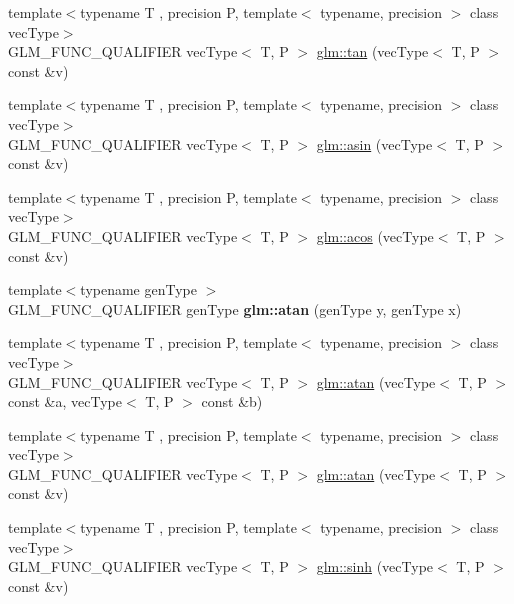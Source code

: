 \begin{DoxyCompactItemize}
\item 
{\footnotesize template$<$typename T , precision P, template$<$ typename, precision $>$ class vec\+Type$>$ }\\G\+L\+M\+\_\+\+F\+U\+N\+C\+\_\+\+Q\+U\+A\+L\+I\+F\+I\+ER vec\+Type$<$ T, P $>$ \hyperlink{group__core__func__trigonometric_gab3ae890c38b7d3aa4d5e00998fd296b2}{glm\+::tan} (vec\+Type$<$ T, P $>$ const \&v)
\item 
{\footnotesize template$<$typename T , precision P, template$<$ typename, precision $>$ class vec\+Type$>$ }\\G\+L\+M\+\_\+\+F\+U\+N\+C\+\_\+\+Q\+U\+A\+L\+I\+F\+I\+ER vec\+Type$<$ T, P $>$ \hyperlink{group__core__func__trigonometric_ga88e29b8289e882859d76a25798dd9490}{glm\+::asin} (vec\+Type$<$ T, P $>$ const \&v)
\item 
{\footnotesize template$<$typename T , precision P, template$<$ typename, precision $>$ class vec\+Type$>$ }\\G\+L\+M\+\_\+\+F\+U\+N\+C\+\_\+\+Q\+U\+A\+L\+I\+F\+I\+ER vec\+Type$<$ T, P $>$ \hyperlink{group__core__func__trigonometric_ga58ad259b788528fe0a4bd2eeb5e381cc}{glm\+::acos} (vec\+Type$<$ T, P $>$ const \&v)
\item 
\mbox{\label{func__trigonometric_8inl_a29204e55958a4011bfd1a6df7129984b}} 
{\footnotesize template$<$typename gen\+Type $>$ }\\G\+L\+M\+\_\+\+F\+U\+N\+C\+\_\+\+Q\+U\+A\+L\+I\+F\+I\+ER gen\+Type {\bfseries glm\+::atan} (gen\+Type y, gen\+Type x)
\item 
{\footnotesize template$<$typename T , precision P, template$<$ typename, precision $>$ class vec\+Type$>$ }\\G\+L\+M\+\_\+\+F\+U\+N\+C\+\_\+\+Q\+U\+A\+L\+I\+F\+I\+ER vec\+Type$<$ T, P $>$ \hyperlink{group__core__func__trigonometric_ga461e769acb8b8cb695a5a89334546611}{glm\+::atan} (vec\+Type$<$ T, P $>$ const \&a, vec\+Type$<$ T, P $>$ const \&b)
\item 
{\footnotesize template$<$typename T , precision P, template$<$ typename, precision $>$ class vec\+Type$>$ }\\G\+L\+M\+\_\+\+F\+U\+N\+C\+\_\+\+Q\+U\+A\+L\+I\+F\+I\+ER vec\+Type$<$ T, P $>$ \hyperlink{group__core__func__trigonometric_gae8f22458bba8f2321ceb1bfc4a543216}{glm\+::atan} (vec\+Type$<$ T, P $>$ const \&v)
\item 
{\footnotesize template$<$typename T , precision P, template$<$ typename, precision $>$ class vec\+Type$>$ }\\G\+L\+M\+\_\+\+F\+U\+N\+C\+\_\+\+Q\+U\+A\+L\+I\+F\+I\+ER vec\+Type$<$ T, P $>$ \hyperlink{group__core__func__trigonometric_gad8f89c12efe6f8d3ae8046625b266254}{glm\+::sinh} (vec\+Type$<$ T, P $>$ const \&v)

\end{DoxyCompactItemize}
